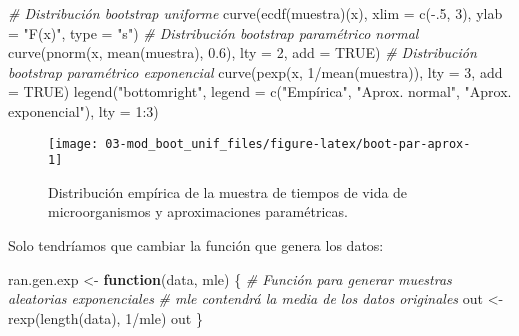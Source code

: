 \documentclass[
]{book}
\newenvironment{Shaded}{\begin{snugshade}}{\end{snugshade}}
\newcommand{\AttributeTok}[1]{\textcolor[rgb]{0.77,0.63,0.00}{#1}}
\newcommand{\CommentTok}[1]{\textcolor[rgb]{0.56,0.35,0.01}{\textit{#1}}}
\newcommand{\ConstantTok}[1]{\textcolor[rgb]{0.00,0.00,0.00}{#1}}
\newcommand{\ControlFlowTok}[1]{\textcolor[rgb]{0.13,0.29,0.53}{\textbf{#1}}}
\newcommand{\DecValTok}[1]{\textcolor[rgb]{0.00,0.00,0.81}{#1}}
\newcommand{\FloatTok}[1]{\textcolor[rgb]{0.00,0.00,0.81}{#1}}
\newcommand{\FunctionTok}[1]{\textcolor[rgb]{0.00,0.00,0.00}{#1}}
\newcommand{\NormalTok}[1]{#1}
\newcommand{\OtherTok}[1]{\textcolor[rgb]{0.56,0.35,0.01}{#1}}
\newcommand{\SpecialCharTok}[1]{\textcolor[rgb]{0.00,0.00,0.00}{#1}}
\newcommand{\StringTok}[1]{\textcolor[rgb]{0.31,0.60,0.02}{#1}}
\theoremstyle{break}
\theoremstyle{definition}
\theoremstyle{definition}
\theoremstyle{definition}
\theoremstyle{definition}
\theoremstyle{remark}
\begin{document}
\begin{Shaded}
\begin{Highlighting}[]
\CommentTok{\# Distribución bootstrap uniforme}
\FunctionTok{curve}\NormalTok{(}\FunctionTok{ecdf}\NormalTok{(muestra)(x), }\AttributeTok{xlim =} \FunctionTok{c}\NormalTok{(}\SpecialCharTok{{-}}\NormalTok{.}\DecValTok{5}\NormalTok{, }\DecValTok{3}\NormalTok{), }\AttributeTok{ylab =} \StringTok{"F(x)"}\NormalTok{, }\AttributeTok{type =} \StringTok{"s"}\NormalTok{)}
\CommentTok{\# Distribución bootstrap paramétrico normal}
\FunctionTok{curve}\NormalTok{(}\FunctionTok{pnorm}\NormalTok{(x, }\FunctionTok{mean}\NormalTok{(muestra), }\FloatTok{0.6}\NormalTok{), }\AttributeTok{lty =} \DecValTok{2}\NormalTok{, }\AttributeTok{add =} \ConstantTok{TRUE}\NormalTok{)}
\CommentTok{\# Distribución bootstrap paramétrico exponencial}
\FunctionTok{curve}\NormalTok{(}\FunctionTok{pexp}\NormalTok{(x, }\DecValTok{1}\SpecialCharTok{/}\FunctionTok{mean}\NormalTok{(muestra)), }\AttributeTok{lty =} \DecValTok{3}\NormalTok{, }\AttributeTok{add =} \ConstantTok{TRUE}\NormalTok{)}
\FunctionTok{legend}\NormalTok{(}\StringTok{"bottomright"}\NormalTok{, }\AttributeTok{legend =} \FunctionTok{c}\NormalTok{(}\StringTok{"Empírica"}\NormalTok{, }\StringTok{"Aprox. normal"}\NormalTok{, }\StringTok{"Aprox. exponencial"}\NormalTok{), }\AttributeTok{lty =} \DecValTok{1}\SpecialCharTok{:}\DecValTok{3}\NormalTok{)}
\end{Highlighting}
\end{Shaded}

\begin{figure}[!htb]

{\centering \texttt{[image: 03-mod\_boot\_unif\_files/figure-latex/boot-par-aprox-1]} 

}

\caption{Distribución empírica de la muestra de tiempos de vida de microorganismos y aproximaciones paramétricas.}\label{fig:boot-par-aprox}
\end{figure}

Solo tendríamos que cambiar la función que genera los datos:

\begin{Shaded}
\begin{Highlighting}[]
\NormalTok{ran.gen.exp }\OtherTok{\textless{}{-}} \ControlFlowTok{function}\NormalTok{(data, mle) \{}
    \CommentTok{\# Función para generar muestras aleatorias exponenciales}
    \CommentTok{\# mle contendrá la media de los datos originales}
\NormalTok{    out }\OtherTok{\textless{}{-}} \FunctionTok{rexp}\NormalTok{(}\FunctionTok{length}\NormalTok{(data), }\DecValTok{1}\SpecialCharTok{/}\NormalTok{mle)}
\NormalTok{    out}
\NormalTok{\}}
\end{Highlighting}
\end{Shaded}
\end{document}
